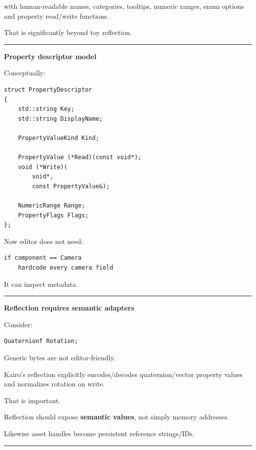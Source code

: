 with human-readable names, categories, tooltips, numeric ranges, enum options and property read/write functions.

That is significantly beyond toy reflection.

\begin{center}\rule{0.5\linewidth}{0.5pt}\end{center}

\textbf{Property descriptor model}

Conceptually:

\begin{verbatim}
struct PropertyDescriptor
{
    std::string Key;
    std::string DisplayName;

    PropertyValueKind Kind;

    PropertyValue (*Read)(const void*);
    void (*Write)(
        void*,
        const PropertyValue&);

    NumericRange Range;
    PropertyFlags Flags;
};
\end{verbatim}

Now editor does not need:

\begin{verbatim}
if component == Camera
    hardcode every camera field
\end{verbatim}

It can inspect metadata.

\begin{center}\rule{0.5\linewidth}{0.5pt}\end{center}

\textbf{Reflection requires semantic adapters}

Consider:

\begin{verbatim}
Quaternionf Rotation;
\end{verbatim}

Generic bytes are not editor-friendly.

Kairo's reflection explicitly encodes/decodes quaternion/vector property values and normalizes rotation on write.

That is important.

Reflection should expose \textbf{semantic values}, not simply memory addresses.

Likewise asset handles become persistent reference strings/IDs.

\begin{center}\rule{0.5\linewidth}{0.5pt}\end{center}

